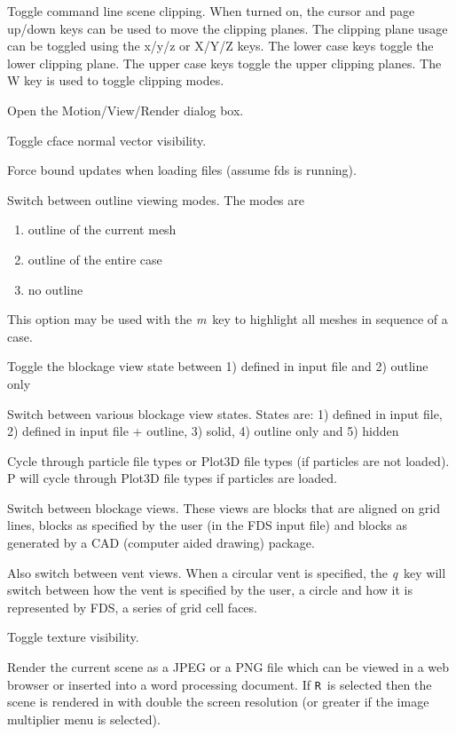 \documentclass[11pt,twoside]{book}
\newcommand{\kitem}[1]{\item[{\bf {\tt #1 \  }} \hfill]}
\begin{document}
\kitem{M}Toggle command line scene clipping.  When turned on, the
cursor and page up/down keys can be used to move the clipping planes.
The clipping plane usage can be toggled using the x/y/z or X/Y/Z keys.
The lower case keys toggle the lower clipping plane.  The upper case
keys toggle the upper clipping planes.
The W key is used to toggle clipping modes.

\kitem{ALT m}Open the Motion/View/Render dialog box.

\kitem{n}Toggle cface normal vector visibility.

\kitem{N}Force bound updates when loading files (assume fds is running).

\kitem{o}Switch between outline viewing modes. The modes are
\begin{enumerate}
\item outline of the current mesh
\item outline of the entire case
\item no outline
\end{enumerate}
This option may be used with the {\em m}\ key to highlight all meshes in sequence of a case.

\kitem{O}Toggle the blockage view state between 1) defined in input file and 2) outline only

\kitem{ALT o}Switch between various blockage view states.  States are:
1) defined in input file,
2) defined in input file + outline,
3) solid,
4) outline only and
5) hidden

\kitem{p, P}Cycle through particle file types or Plot3D file types (if particles are not loaded).
P will cycle through Plot3D file types if particles are loaded.

\kitem{q}Switch between blockage views.  These views are blocks
that are aligned on grid lines, blocks as specified by the user
(in the FDS input file) and blocks as generated by a CAD (computer
aided drawing) package.

Also switch between vent views.  When a circular vent is specified,
the {\em q}\ key will switch between how the vent is specified by the user, a circle
and how it is represented by FDS, a series of grid cell faces.

\kitem{Q}Toggle texture visibility.

\kitem{r,R}Render the current scene as a JPEG or a PNG file which
can be viewed in a web browser or inserted into a word processing
document.  If {\tt R}\ is selected then the
scene is rendered in with double the screen resolution (or greater if the image multiplier menu is selected).
\end{document}
